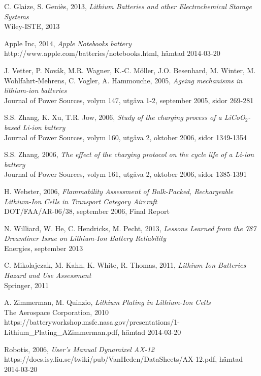 \documentclass[a4paper,12pt]{article}
\begin{document}
\begin{thebibliography}{9}
 C. Glaize, S. Geniès, 2013, \emph{Lithium Batteries and other Electrochemical Storage Systems}\\ Wiley-ISTE, 2013

 Apple Inc, 2014, \emph{Apple Notebooks battery}
\\ http://www.apple.com/batteries/notebooks.html, hämtad 2014-03-20

 J. Vetter, P. Novák, M.R. Wagner, K.-C. Möller, J.O. Besenhard, M. Winter, M. Wohlfahrt-Mehrens, C. Vogler, A. Hammouche, 2005, \emph{Ageing mechanisms in lithium-ion batteries}
\\ Journal of Power Sources, volym 147, utgåva 1-2, september 2005, sidor 269-281

 S.S. Zhang, K. Xu, T.R. Jow, 2006, \emph{Study of the charging process of a LiCoO$_{2}$-based Li-ion battery}
\\ Journal of Power Sources, volym 160, utgåva 2, oktober 2006, sidor 1349-1354

 S.S. Zhang, 2006, \emph{The effect of the charging protocol on the cycle life of a Li-ion battery}
\\ Journal of Power Sources, volym 161, utgåva 2, oktober 2006, sidor 1385-1391

 H. Webster, 2006, \emph{Flammability Assessment of Bulk-Packed, Rechargeable Lithium-Ion Cells in Transport Category Aircraft}
\\DOT/FAA/AR-06/38, september 2006, Final Report

 N. Williard, W. He, C. Hendricks, M. Pecht, 2013, \emph{Lessons Learned from the 787 Dreamliner Issue on Lithium-Ion Battery Reliability}
\\Energies, september 2013

 C. Mikolajczak, M. Kahn, K. White, R. Thomas, 2011, \emph{Lithium-Ion Batteries Hazard and Use Assessment}
\\Springer, 2011

 A. Zimmerman, M. Quinzio, \emph{Lithium Plating in Lithium-Ion Cells}
\\The Aerospace Corporation, 2010
\\https://batteryworkshop.msfc.nasa.gov/presentations/1-Lithium\_Plating\_AZimmerman.pdf, hämtad 2014-03-20 

 Robotis, 2006, \emph{User's Manual Dynamixel AX-12}
 \\ https://docs.isy.liu.se/twiki/pub/VanHeden/DataSheets/AX-12.pdf, hämtad 2014-03-20


\end{thebibliography}
\end{document}
